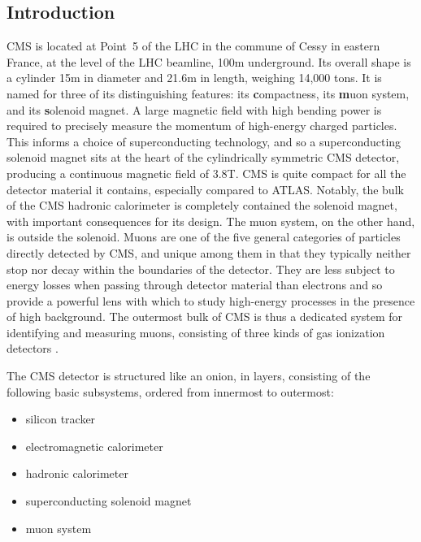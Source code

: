 \subsection{Introduction}
\label{cms:intro}
CMS is located at Point~5 of the LHC in the commune of Cessy in eastern France, at the level of the LHC beamline, 100\unit{m} underground.
Its overall shape is a cylinder 15\unit{m} in diameter and 21.6\unit{m} in length, weighing 14,000 tons.
It is named for three of its distinguishing features: its \textbf{c}ompactness, its \textbf{m}uon system, and its \textbf{s}olenoid magnet.
A large magnetic field with high bending power is required to precisely measure the momentum of high-energy charged particles.
This informs a choice of superconducting technology, and so a superconducting solenoid magnet sits at the heart of the cylindrically symmetric CMS detector, producing a continuous magnetic field of 3.8\unit{T}.
CMS is quite compact for all the detector material it contains, especially compared to ATLAS.
Notably, the bulk of the CMS hadronic calorimeter is completely contained the solenoid magnet, with important consequences for its design.
The muon system, on the other hand, is outside the solenoid.
Muons are one of the five general categories of particles directly detected by CMS, and unique among them in that they typically neither stop nor decay within the boundaries of the detector.
They are less subject to energy losses when passing through detector material than electrons and so provide a powerful lens with which to study high-energy processes in the presence of high background.
The outermost bulk of CMS is thus a dedicated system for identifying and measuring muons, consisting of three kinds of gas ionization detectors \cite{Chatrchyan:2008zzk}.

The CMS detector is structured like an onion, in layers, consisting of the following basic subsystems, ordered from innermost to outermost:
\begin{itemize}
  \item silicon tracker
  \item electromagnetic calorimeter
  \item hadronic calorimeter
  \item superconducting solenoid magnet
  \item muon system
\end{itemize}


